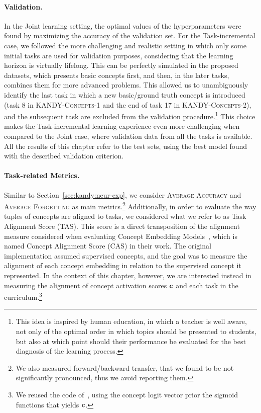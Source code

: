 \paragraph{Validation.} In the Joint learning setting, the optimal values of the hyperparameters were found by maximizing the accuracy of the validation set. For the Task-incremental case, we followed the more challenging and realistic setting in which only some initial tasks are used for validation purposes, considering that the learning horizon is virtually lifelong. This can be perfectly simulated in  the proposed datasets, %
which presents basic concepts first, and then, in the later tasks, combines them for more advanced problems. This allowed us to %
unambiguously identify the last task in which a new basic/ground truth concept is introduced (task 8 in \textsc{KANDY-Concepts-1} and the end of task 17  in \textsc{KANDY-Concepts-2}), and the subsequent task are excluded from the validation procedure.\footnote{This idea is inspired by human education, in which a teacher is well aware, not only of the optimal order in which topics should be presented to students, but also at which point should their performance be evaluated for the best diagnosis of the learning process.} This choice makes the Task-incremental learning experience even more challenging when compared to the Joint case, where validation data from all the tasks is available. All the results of this chapter refer to the test sets, using the best model found with the described validation criterion.

\paragraph{Task-related Metrics.} Similar to Section~\ref{sec:kandy:neur-exp}, we consider \textsc{\small Average Accuracy} and \textsc{\small Average Forgetting} as main metrics.\footnote{We also measured forward/backward transfer, that we found to be not significantly pronounced, thus we avoid reporting them.} Additionally, in order to evaluate the way tuples of concepts are aligned to tasks, we considered what we refer to as {\sc\small Task Alignment Score} ({\small\sc TAS}). This score is a direct transposition of the alignment measure considered when evaluating Concept Embedding Models~\cite{espinosa2022concept}, which is named {\sc\small Concept Alignment Score} ({\small\sc CAS}) in their work. The original implementation assumed supervised concepts, and the goal was to measure the alignment of each concept embedding in relation to the supervised concept it represented. In the context of this chapter, however, we are interested instead in measuring the alignment of concept activation scores ${\bm{c}}$ and each task in the curriculum.\footnote{We reused the code of~\cite{espinosa2022concept}, using the concept logit vector prior the sigmoid functions that yields ${\bm{c}}$.}

